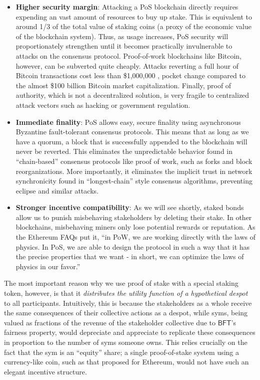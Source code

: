 \documentclass[letterpaper,12pt,oneside]{article}
\begin{document}
\begin{itemize}
    \item \textbf{Higher security margin}: Attacking a PoS blockchain directly requires expending an vast amount of resources to buy up stake. This is equivalent to around 1/3 of the total value of staking coins (a proxy of the economic value of the blockchain system). Thus, as usage increases, PoS  security will proportionately strengthen until it becomes practically invulnerable to attacks on the consensus protocol. Proof-of-work blockchains like Bitcoin, however, can be subverted quite cheaply. Attacks reverting a full hour of Bitcoin transactions cost less than \$1,000,000 \cite{crypto51}, pocket change compared to the almost \$100 billion Bitcoin market capitalization. Finally, proof of authority, which is not a decentralized solution, is very fragile to centralized attack vectors such as hacking or government regulation.
    \item \textbf{Immediate finality}: PoS allows easy, secure finality using asynchronous Byzantine fault-tolerant consensus protocols. This means that as long as we have a quorum, a block that is successfully appended to the blockchain will never be reverted. This eliminates the unpredictable behavior found in ``chain-based'' consensus protocols like proof of work, such as forks and block reorganizations. More importantly, it eliminates the implicit trust in network synchronicity found in ``longest-chain'' style consensus algorithms, preventing eclipse and similar attacks.
    \item \textbf{Stronger incentive compatibility}: As we will see shortly, staked bonds allow us to punish misbehaving stakeholders by deleting their stake. In other blockchains, misbehaving miners only lose potential rewards or reputation. As the Ethereum FAQs put it, ``in PoW, we are working directly with the laws of physics. In PoS, we are able to design the protocol in such a way that it has the precise properties that we want - in short, we can optimize the laws of physics in our favor.''
\end{itemize}

The most important reason why we use proof of stake with a special staking token, however, is that it \emph{distributes the utility function of a hypothetical despot} to all participants. Intuitively, this is because the stakeholders as a whole receive the same consequences of their collective actions as a despot, while syms, being valued as fractions of the revenue of the stakeholder collective due to $\mathsf{BFT}$'s fairness property, would depreciate and appreciate to replicate these consequences in proportion to the number of syms someone owns. This relies crucially on the fact that the sym is an ``equity'' share; a single proof-of-stake system using a currency-like coin, such as that proposed for Ethereum, would not have such an elegant incentive structure.
\end{document}
